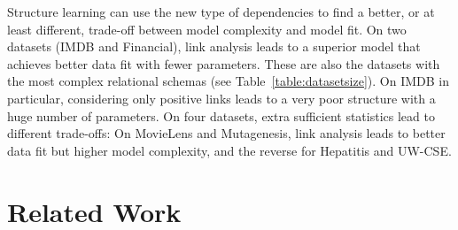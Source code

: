 \documentclass{sig-alternate-2013}
\begin{document}
\begin{table}[htb]
\begin{center}
\end{center}
\caption{Comparison of Statistical Performance of Bayesian Network Learning.
}
\label{table:result_scores}
\end{table}




Structure learning can use the new type of dependencies to find a better, or at least different, trade-off between model complexity and model fit.
On two datasets (IMDB and Financial), link analysis leads to a superior model that achieves better data fit with fewer parameters. These are also the datasets with the most complex relational schemas (see Table~\ref{table:datasetsize}). On IMDB in particular, considering only positive links leads to a very poor structure with a huge number of parameters.
On four datasets, extra sufficient statistics lead to different trade-offs: On MovieLens and Mutagenesis, link analysis leads to better data fit but higher model complexity, and the reverse for Hepatitis and UW-CSE. 


\section{Related Work} 
\end{document}
